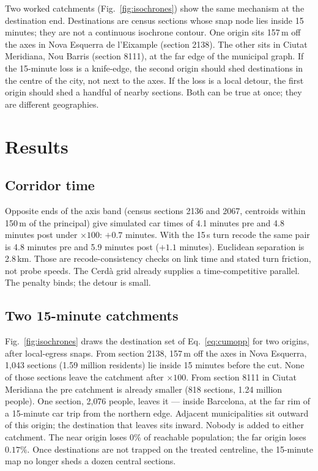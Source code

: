 \documentclass[a4paper,fleqn]{cas-dc}
\begin{document}
Two worked catchments (Fig.~\ref{fig:isochrones}) show the same mechanism at
the destination end. Destinations are census sections whose snap node lies
inside 15 minutes; they are not a continuous isochrone contour. One origin
sits 157\,m off the axes in Nova Esquerra de l'Eixample (section 2138). The
other sits in Ciutat Meridiana, Nou Barris (section 8111), at the far edge
of the municipal graph. If the 15-minute loss is a knife-edge, the second
origin should shed destinations in the centre of the city, not next to the
axes. If the loss is a local detour, the first origin should shed a handful
of nearby sections. Both can be true at once; they are different
geographies.

\section{Results}
\label{sec:results}

\subsection{Corridor time}

Opposite ends of the axis band (census sections 2136 and 2067, centroids
within 150\,m of the principal) give simulated car times of 4.1 minutes
pre and 4.8 minutes post under $\times 100$:
$+0.7$ minutes. With the 15\,s turn recode the same pair is 4.8
minutes pre and 5.9 minutes post ($+1.1$ minutes). Euclidean
separation is 2.8\,km. Those are recode-consistency checks on link time and
stated turn friction, not probe speeds. The Cerd\`a grid already supplies a
time-competitive parallel. The penalty binds; the detour is small.

\subsection{Two 15-minute catchments}

Fig.~\ref{fig:isochrones} draws the destination set of Eq.~\eqref{eq:cumopp}
for two origins, after local-egress snaps. From section 2138, 157\,m off the
axes in Nova Esquerra, 1{,}043 sections (1.59 million residents) lie inside
15 minutes before the cut. None of those sections leave the catchment after
$\times 100$. From section 8111 in Ciutat Meridiana the pre catchment is
already smaller (818 sections, 1.24 million people). One section, 2{,}076
people, leaves it --- inside Barcelona, at the far rim of a 15-minute car
trip from the northern edge. Adjacent municipalities sit outward of this
origin; the destination that leaves sits inward. Nobody is added to either
catchment. The near origin loses 0\% of reachable population; the far origin
loses $0.17\%$. Once destinations are not trapped on the treated centreline,
the 15-minute map no longer sheds a dozen central sections.
\end{document}
